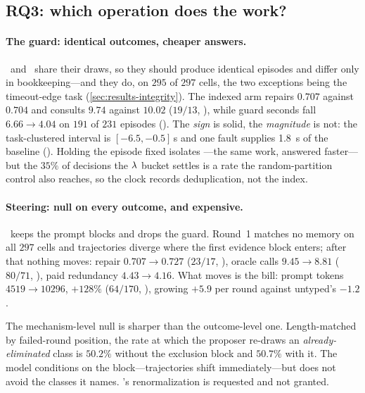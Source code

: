 \subsection{RQ3: which operation does the work?}
\label{sec:results-ablation}

\ifsuppmatter\else\fi

\paragraph{The guard: identical outcomes, cheaper answers.}
\armguard\ and \armuntyped\ share their draws, so they should produce identical
episodes and differ only in bookkeeping---and they do, on $295$ of $297$ cells,
the two exceptions being the timeout-edge task (\cref{sec:results-integrity}).
The indexed arm repairs $0.707$ against $0.704$ and consults $9.74$ against
$10.02$ ($19/13$, ), while guard seconds fall $6.66 \to 4.04$ on
$191$ of $231$ episodes (). The \emph{sign} is solid, the
\emph{magnitude} is not: the task-clustered interval is $[-6.5, -0.5]$\,s and
one fault supplies \SI{1.8}{\second} of the baseline
(). Holding the episode fixed isolates
\Rguardcost---the same work, answered faster---but the $35\%$ of decisions the
$\lambda$ bucket settles is a rate the random-partition control also reaches, so
the clock records deduplication, not the index.

\paragraph{Steering: null on every outcome, and expensive.}
\armsteer\ keeps the prompt blocks and drops the guard. Round~1 matches no
memory on all $297$ cells and trajectories diverge where the first evidence
block enters; after that nothing moves: repair $0.707 \to 0.727$ ($23/17$,
), oracle calls $9.45 \to 8.81$ ($80/71$, ), paid
redundancy $4.43 \to 4.16$. What
moves is the bill: prompt tokens $4519 \to \num{10296}$, $+128\%$ ($64/170$,
), growing $+5.9$ per round against untyped's $-1.2$.

The mechanism-level null is sharper than the outcome-level one. Length-matched
by failed-round position, the rate at which the proposer re-draws an
\emph{already-eliminated} class is $50.2\%$ without the exclusion block and
$50.7\%$ with it. The model conditions on the block---trajectories shift
immediately---but does not avoid the classes it names.
's renormalization is requested and not granted.

